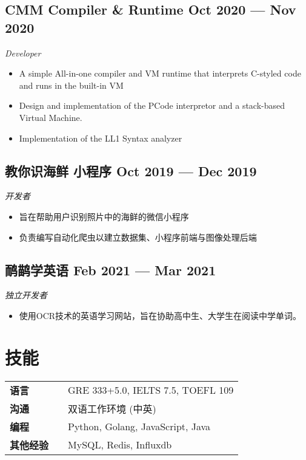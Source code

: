 \documentclass[a4,12pt]{article}
\newcommand{\subtext}[1]{
#1\par\vspace{-0.3cm}}
\newenvironment{zitemize}{
\begin{itemize}\itemsep0pt \parskip0pt \parsep1pt}
{\end{itemize}\vspace{-0.5cm}}
\newcommand{\hskills}[1]{
\textbf{\bfseries #1} }
\begin{document}
\subsection*{CMM Compiler \& Runtime  \hfill \textbf{Oct 2020 --- Nov 2020}}
\subtext{\textit{Developer}}
\begin{zitemize}
    \item  A simple All-in-one compiler and VM runtime that interprets C-styled code and runs in the built-in VM
    \item Design and implementation of the PCode interpretor and a stack-based Virtual Machine.
    \item Implementation of the LL1 Syntax analyzer
\end{zitemize}

\subsection*{教你识海鲜 小程序 \hfill \textbf{Oct 2019 --- Dec 2019}}
\subtext{\textit{开发者}}
\begin{zitemize}
    \item 旨在帮助用户识别照片中的海鲜的微信小程序 
    \item 负责编写自动化爬虫以建立数据集、小程序前端与图像处理后端
\end{zitemize}

\subsection*{鸸鹋学英语 \hfill \textbf{Feb 2021 --- Mar 2021}}
\subtext{\textit{独立开发者}}
\begin{zitemize}
    \item 使用OCR技术的英语学习网站，旨在协助高中生、大学生在阅读中学单词。
\end{zitemize}


\section{\textbf{技能}}
\begin{tabular}{p{11em} p{1em} p{43em}}
\hskills{语言} & & GRE 333+5.0, IELTS 7.5, TOEFL 109 \\
\hskills{沟通} & & 双语工作环境 (中英)  \\
\hskills{编程} &  & Python, Golang, JavaScript, Java \\
\hskills{其他经验} & & MySQL, Redis, Influxdb
\end{tabular}
\vspace{-0.2cm}
\end{document}
